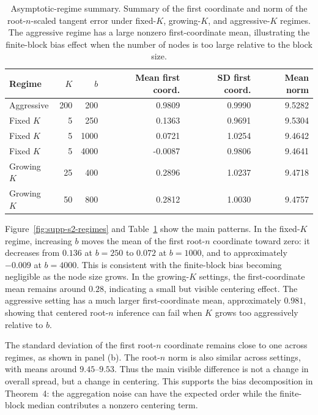 \documentclass[11pt]{article}
\begin{document}
\begin{table}[ht!]
\centering
\caption{
{Asymptotic-regime summary.}
Summary of the first coordinate and norm of the root-\(n\)-scaled tangent error under fixed-\(K\), growing-\(K\), and aggressive-\(K\) regimes.  The aggressive regime has a large nonzero first-coordinate mean, illustrating the finite-block bias effect when the number of nodes is too large relative to the block size.
}
\label{tab:supp-s2-summary}
\begin{tabular}{lrrrrr}
\toprule
Regime & \(K\) & \(b\) & Mean first coord. & SD first coord. & Mean norm \\
\midrule
Aggressive & 200 & 200 & 0.9809 & 0.9990 & 9.5282 \\
Fixed \(K\) & 5 & 250 & 0.1363 & 0.9691 & 9.5304 \\
Fixed \(K\) & 5 & 1000 & 0.0721 & 1.0254 & 9.4642 \\
Fixed \(K\) & 5 & 4000 & -0.0087 & 0.9806 & 9.4641 \\
Growing \(K\) & 25 & 400 & 0.2896 & 1.0237 & 9.4718 \\
Growing \(K\) & 50 & 800 & 0.2812 & 1.0030 & 9.4757 \\
\bottomrule
\end{tabular}
\end{table}

Figure~\ref{fig:supp-s2-regimes} and Table~\ref{tab:supp-s2-summary} show the main patterns.  In the fixed-\(K\) regime, increasing \(b\) moves the mean of the first root-\(n\) coordinate toward zero: it decreases from \(0.136\) at \(b=250\) to \(0.072\) at \(b=1000\), and to approximately \(-0.009\) at \(b=4000\).  This is consistent with the finite-block bias becoming negligible as the node size grows.  In the growing-\(K\) settings, the first-coordinate mean remains around \(0.28\), indicating a small but visible centering effect.  The aggressive setting has a much larger first-coordinate mean, approximately \(0.981\), showing that centered root-\(n\) inference can fail when \(K\) grows too aggressively relative to \(b\).

The standard deviation of the first root-\(n\) coordinate remains close to one across regimes, as shown in panel (b).  The root-\(n\) norm is also similar across settings, with means around \(9.45\)--\(9.53\).  Thus the main visible difference is not a change in overall spread, but a change in centering.  This supports the bias decomposition in Theorem~4: the aggregation noise can have the expected order while the finite-block median contributes a nonzero centering term.
\end{document}
